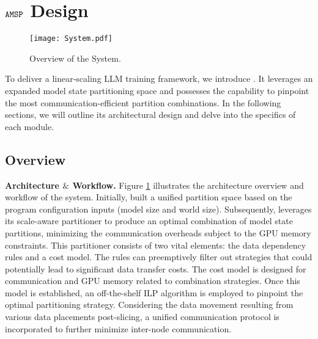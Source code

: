 \section{$\texttt{AMSP}$ Design}
\label{sec_design}

\begin{figure}[t]
    \centering
    \texttt{[image: System.pdf]}
    \caption{Overview of the \SysName System.}
    \label{SystemOverview}
\end{figure}

To deliver a linear-scaling LLM training framework, we introduce \SysName. It leverages an expanded model state partitioning space and possesses the capability to pinpoint the most communication-efficient partition combinations. In the following sections, we will outline its architectural design and delve into the specifics of each module.

\subsection{Overview}
\noindent\textbf{Architecture $\&$ Workflow.}
Figure \ref{SystemOverview} illustrates the architecture overview and workflow of the \SysName system. 
Initially, \SysName built a unified partition space based on the program configuration inputs (model size and world size).
Subsequently, \SysName leverages its scale-aware partitioner to produce an optimal combination of model state partitions, 
minimizing the communication overheads subject to the GPU memory constraints. 
This partitioner consists of two vital elements: the data dependency rules and a cost model. The rules can preemptively filter out strategies that could potentially lead to significant data transfer costs. The cost model is designed for communication and GPU memory related to combination strategies. 
Once this model is established, an off-the-shelf ILP algorithm is employed to pinpoint the optimal partitioning strategy. Considering the data movement resulting from various data placements post-slicing, a unified communication protocol is incorporated to further minimize inter-node communication.

